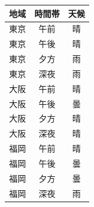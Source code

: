 \begin{center}
	\begin{tabular}{ccc}
		地域 & 時間帯 & 天候 \\\hline
		東京 & 午前  & 晴  \\
		東京 & 午後  & 晴  \\
		東京 & 夕方  & 雨  \\
		東京 & 深夜  & 雨  \\
		大阪 & 午前  & 晴  \\
		大阪 & 午後  & 曇  \\
		大阪 & 夕方  & 晴  \\
		大阪 & 深夜  & 晴  \\
		福岡 & 午前  & 晴  \\
		福岡 & 午後  & 曇  \\
		福岡 & 夕方  & 曇  \\
		福岡 & 深夜  & 雨  \\\hline
	\end{tabular}
	\label{tbl::usingR_tidy}
\end{center}
